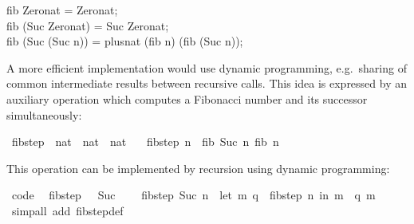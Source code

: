 \begin{isabellebody}
\begin{isamarkuptext}
\hspace*{0pt}fib Zero{}nat = Zero{}nat;\\
\hspace*{0pt}fib (Suc Zero{}nat) = Suc Zero{}nat;\\
\hspace*{0pt}fib (Suc (Suc n)) = plus{}nat (fib n) (fib (Suc n));%
\end{isamarkuptext}%
\isamarkuptrue%
%
\endisatagquote
{\isafoldquote}%
%
\isadelimquote
%
\endisadelimquote
%
\begin{isamarkuptext}%
\noindent A more efficient implementation would use dynamic
  programming, e.g.~sharing of common intermediate results between
  recursive calls.  This idea is expressed by an auxiliary operation
  which computes a Fibonacci number and its successor simultaneously:%
\end{isamarkuptext}%
\isamarkuptrue%
%
\isadelimquote
%
\endisadelimquote
%
\isatagquote
{}\isamarkupfalse%
\ fib{\isacharunderscore}step\ {\isacharcolon}{\isacharcolon}\ {\isachardoublequoteopen}nat\ {\isasymRightarrow}\ nat\ {\isasymtimes}\ nat{\isachardoublequoteclose}\ \isanewline
\ \ {\isachardoublequoteopen}fib{\isacharunderscore}step\ n\ {\isacharequal}\ {\isacharparenleft}fib\ {\isacharparenleft}Suc\ n{\isacharparenright}{\isacharcomma}\ fib\ n{\isacharparenright}{\isachardoublequoteclose}%
\endisatagquote
{\isafoldquote}%
%
\isadelimquote
%
\endisadelimquote
%
\begin{isamarkuptext}%
\noindent This operation can be implemented by recursion using
  dynamic programming:%
\end{isamarkuptext}%
\isamarkuptrue%
%
\isadelimquote
%
\endisadelimquote
%
\isatagquote
{}\isamarkupfalse%
\ {\isacharbrackleft}code{\isacharbrackright}{\isacharcolon}\isanewline
\ \ {\isachardoublequoteopen}fib{\isacharunderscore}step\ {}\ {\isacharequal}\ {\isacharparenleft}Suc\ {}{\isacharcomma}\ {}{\isacharparenright}{\isachardoublequoteclose}\isanewline
\ \ {\isachardoublequoteopen}fib{\isacharunderscore}step\ {\isacharparenleft}Suc\ n{\isacharparenright}\ {\isacharequal}\ {\isacharparenleft}let\ {\isacharparenleft}m{\isacharcomma}\ q{\isacharparenright}\ {\isacharequal}\ fib{\isacharunderscore}step\ n\ in\ {\isacharparenleft}m\ {\isacharplus}\ q{\isacharcomma}\ m{\isacharparenright}{\isacharparenright}{\isachardoublequoteclose}\isanewline
\ \ \isamarkupfalse%
\ {\isacharparenleft}simp{\isacharunderscore}all\ add{\isacharcolon}\ fib{\isacharunderscore}step{\isacharunderscore}def{\isacharparenright}%

\end{isabellebody}
